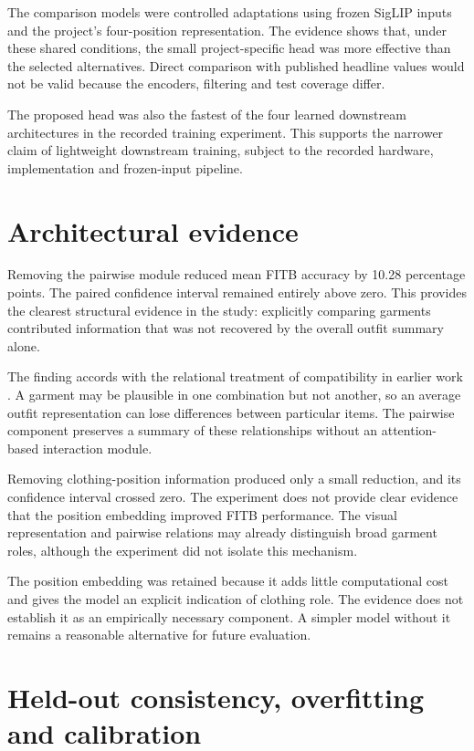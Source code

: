 The comparison models were controlled adaptations
using frozen SigLIP inputs and the project's four-position representation. The
evidence shows that, under these shared conditions, the small project-specific head was
more effective than the selected alternatives. Direct comparison with published
headline values would not be valid because the encoders, filtering and test
coverage differ.

The proposed head was also the fastest of the four learned downstream
architectures in the recorded training experiment. This supports the narrower
claim of lightweight downstream training, subject to the recorded hardware,
implementation and frozen-input pipeline.

\section{Architectural evidence}

Removing the pairwise module reduced mean FITB accuracy by 10.28 percentage
points. The paired confidence interval remained entirely above zero. This
provides the clearest structural evidence in the study: explicitly comparing
garments contributed information that was not recovered by the overall outfit
summary alone.

The finding accords with the relational treatment of compatibility in earlier
work \parencite{vasileva2018typeaware,sarkar2023outfittransformer}. A garment
may be plausible in one combination but not another, so an average outfit
representation can lose differences between particular items. The pairwise
component preserves a summary of these relationships without an
attention-based interaction module.

Removing clothing-position information produced only a small reduction, and
its confidence interval crossed zero. The experiment does not provide
clear evidence that the position embedding improved FITB performance. The
visual representation and pairwise relations may already distinguish broad
garment roles, although the experiment did not isolate this mechanism.

The position embedding was retained because it adds little computational cost
and gives the model an explicit indication of clothing role. The evidence does
not establish it as an empirically necessary component. A simpler model
without it remains a reasonable alternative for future evaluation.

\section{Held-out consistency, overfitting and calibration}


